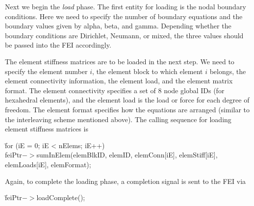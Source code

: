 Next we begin the {\it load} phase. The first entity for loading is the
nodal boundary conditions. Here we need to specify the number of boundary
equations and the boundary values given by {\sf alpha, beta}, and {\sf gamma}.
Depending whether the boundary conditions are Dirichlet, Neumann, or mixed,
the three values should be passed into the FEI accordingly.
                                                                                
The element stiffness matrices are to be loaded in the next step. We need
to specify the element number $i$, the element block to which element $i$
belongs, the element connectivity information, the element load, and the
element matrix format. The element connectivity specifies a set of $8$ node
global IDs (for hexahedral elements), and the element load is the load or
force for each degree of freedom.  The element format specifies how the
equations are arranged (similar to the interleaving scheme mentioned above).
The calling sequence for loading element stiffness matrices is
\begin{tabbing}
\hspace{0.5in} \= {\sf for (iE = 0; iE < nElems; iE++)} \\
 \> \hspace{0.5in} {\sf feiPtr$->$sumInElem(elemBlkID, elemID, elemConn[iE], elemStiff[iE],} \\
 \> \hspace{1.5in} {\sf elemLoads[iE], elemFormat);}
\end{tabbing}
Again, to complete the loading phase, a completion signal is sent to
the FEI via
\begin{tabbing}
\hspace{0.5in} \= {\sf feiPtr$->$loadComplete();}
\end{tabbing}
                                                                                
